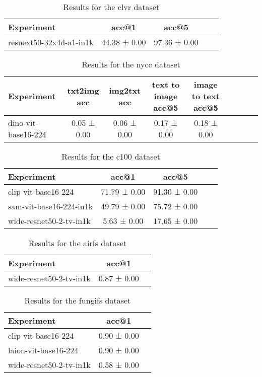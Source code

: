 \begin{table}[htbp]
\caption{Results for the clvr dataset}
\begin{tabular}{|l|c|c|c|c|}\hline
Experiment & acc@1 & acc@5\\
\hline
resnext50-32x4d-a1-in1k & 44.38 ± 0.00 & 97.36 ± 0.00\\
\hline
\end{tabular}
\end{table}

\begin{table}[htbp]
\caption{Results for the nycc dataset}
\begin{tabular}{|l|c|c|c|c|c|c|c|c|}\hline
Experiment & txt2img acc & img2txt acc & text to image acc@5 & image to text acc@5\\
\hline
dino-vit-base16-224 & 0.05 ± 0.00 & 0.06 ± 0.00 & 0.17 ± 0.00 & 0.18 ± 0.00\\
\hline
\end{tabular}
\end{table}

\begin{table}[htbp]
\caption{Results for the c100 dataset}
\begin{tabular}{|l|c|c|c|c|}\hline
Experiment & acc@1 & acc@5\\
\hline
clip-vit-base16-224 & 71.79 ± 0.00 & 91.30 ± 0.00\\
\hline
sam-vit-base16-224-in1k & 49.79 ± 0.00 & 75.72 ± 0.00\\
\hline
wide-resnet50-2-tv-in1k & 5.63 ± 0.00 & 17.65 ± 0.00\\
\hline
\end{tabular}
\end{table}

\begin{table}[htbp]
\caption{Results for the airfs dataset}
\begin{tabular}{|l|c|c|}\hline
Experiment & acc@1\\
\hline
wide-resnet50-2-tv-in1k & 0.87 ± 0.00\\
\hline
\end{tabular}
\end{table}

\begin{table}[htbp]
\caption{Results for the fungifs dataset}
\begin{tabular}{|l|c|c|}\hline
Experiment & acc@1\\
\hline
clip-vit-base16-224 & 0.90 ± 0.00\\
\hline
laion-vit-base16-224 & 0.90 ± 0.00\\
\hline
wide-resnet50-2-tv-in1k & 0.58 ± 0.00\\
\hline
\end{tabular}
\end{table}

